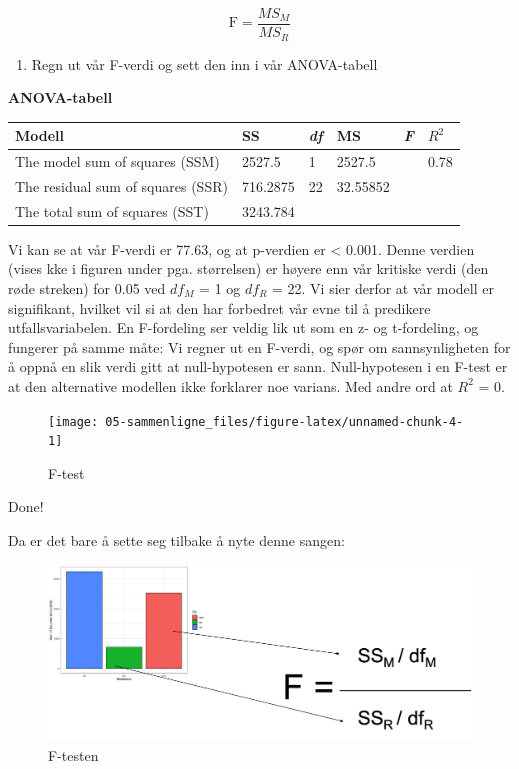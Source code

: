 \documentclass[
]{book}
\providecommand{\tightlist}{%
  \setlength{\itemsep}{0pt}\setlength{\parskip}{0pt}}
\begin{document}
\[
\text{F}  = \frac{MS_M}{MS_R}
\]

\begin{enumerate}
\def\labelenumi{\alph{enumi}.}
\setcounter{enumi}{2}
\tightlist
\item
  Regn ut vår F-verdi og sett den inn i vår ANOVA-tabell
\end{enumerate}

\textbf{ANOVA-tabell}

\begin{longtable}[]{@{}llllll@{}}
\toprule
Modell & SS & \emph{df} & MS & \emph{F} & \(R^2\)\tabularnewline
\midrule
\endhead
The model sum of squares (SSM) & 2527.5 & 1 & 2527.5 & & 0.78\tabularnewline
The residual sum of squares (SSR) & 716.2875 & 22 & 32.55852 & &\tabularnewline
The total sum of squares (SST) & 3243.784 & & & &\tabularnewline
\bottomrule
\end{longtable}

Vi kan se at vår F-verdi er 77.63, og at p-verdien er \textless{} 0.001. Denne verdien (vises kke i figuren under pga. størrelsen) er høyere enn vår kritiske verdi (den røde streken) for 0.05 ved \(df_M\) = 1 og \(df_R\) = 22. Vi sier derfor at vår modell er signifikant, hvilket vil si at den har forbedret vår evne til å predikere utfallsvariabelen. En F-fordeling ser veldig lik ut som en z- og t-fordeling, og fungerer på samme måte: Vi regner ut en F-verdi, og spør om sannsynligheten for å oppnå en slik verdi gitt at null-hypotesen er sann. Null-hypotesen i en F-test er at den alternative modellen ikke forklarer noe varians. Med andre ord at \(R^2\) = 0.

\begin{figure}

{\centering \texttt{[image: 05-sammenligne\_files/figure-latex/unnamed-chunk-4-1]} 

}

\caption{F-test}\label{fig:unnamed-chunk-4}
\end{figure}

{Done!}

Da er det bare å sette seg tilbake å nyte denne sangen:

\begin{figure}
\centering
\includegraphics{F.png}
\caption{F-testen}
\end{figure}
\end{document}
